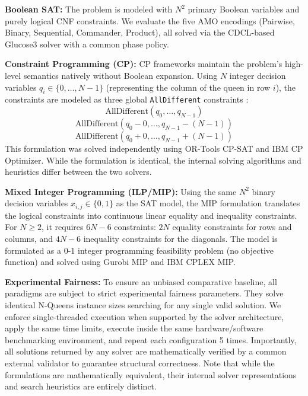 \textbf{Boolean SAT:} The problem is modeled with $N^2$ primary Boolean variables and purely logical CNF constraints. We evaluate the five AMO encodings (Pairwise, Binary, Sequential, Commander, Product), all solved via the CDCL-based Glucose3 solver with a common phase policy.

\textbf{Constraint Programming (CP):} CP frameworks maintain the problem's high-level semantics natively without Boolean expansion. Using $N$ integer decision variables $q_i \in \{0, \dots, N-1\}$ (representing the column of the queen in row $i$), the constraints are modeled as three global \texttt{AllDifferent} constraints \citep{regin1994filtering}:
\begin{equation}
\text{AllDifferent}(q_0, \dots, q_{N-1})
\end{equation}
\begin{equation}
\text{AllDifferent}(q_0 - 0, \dots, q_{N-1} - (N-1))
\end{equation}
\begin{equation}
\text{AllDifferent}(q_0 + 0, \dots, q_{N-1} + (N-1))
\end{equation}
This formulation was solved independently using OR-Tools CP-SAT and IBM CP Optimizer. While the formulation is identical, the internal solving algorithms and heuristics differ between the two solvers.

\textbf{Mixed Integer Programming (ILP/MIP):} Using the same $N^2$ binary decision variables $x_{i,j} \in \{0,1\}$ as the SAT model, the MIP formulation translates the logical constraints into continuous linear equality and inequality constraints. For $N \ge 2$, it requires $6N-6$ constraints: $2N$ equality constraints for rows and columns, and $4N-6$ inequality constraints for the diagonals. The model is formulated as a 0-1 integer programming feasibility problem (no objective function) and solved using Gurobi MIP and IBM CPLEX MIP.

\textbf{Experimental Fairness:} To ensure an unbiased comparative baseline, all paradigms are subject to strict experimental fairness parameters. They solve identical N-Queens instance sizes searching for any single valid solution. We enforce single-threaded execution when supported by the solver architecture, apply the same time limits, execute inside the same hardware/software benchmarking environment, and repeat each configuration 5 times. Importantly, all solutions returned by any solver are mathematically verified by a common external validator to guarantee structural correctness. Note that while the formulations are mathematically equivalent, their internal solver representations and search heuristics are entirely distinct.

